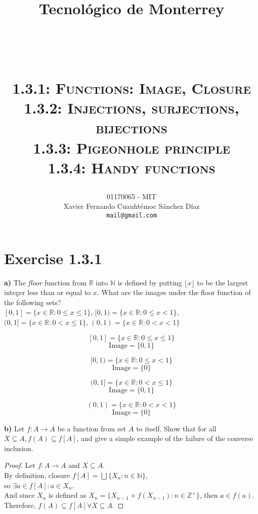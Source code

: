 \documentclass[titlepage, letterpaper, fleqn]{article}
\title{
\vspace{1in}
\textbf{Tecnológico de Monterrey} \\
\vspace{0.5in}
\textmd{\mahclass} \\
\large{\textit{\mahteacher}} \\
\vspace{0.5in}
\textsc{\mahtitle}\\
\textsc{1.3.1: Functions: Image, Closure}\\
\textsc{1.3.2: Injections, surjections, bijections}\\
\textsc{1.3.3: Pigeonhole principle}\\
\textsc{1.3.4: Handy functions}\\
\author{01170065  - MIT \\
Xavier Fernando Cuauhtémoc Sánchez Díaz \\
\texttt{mail@gmail.com}}
\date{\mahdate}
}
\newcommand{\spacepls}{\vspace{5mm}}
\begin{document}
\begin{titlepage}
\maketitle
\end{titlepage}

%
%

\section{Exercise 1.3.1}

{\large \textbf{a)} The \textit{floor} function from \(\mathbb{R}\) into \(\mathbb{N}\) is defined by putting \(\lfloor x \rfloor\) to be the largest integer less than or equal to \(x\).
What are the images under the floor function of the following sets?}\\
\([0,1] = \{x \in \mathbb{R} \colon 0 \leq x \leq 1\}\), \([0,1) = \{x \in \mathbb{R} \colon 0 \leq x < 1\}\),\\
\((0,1] = \{x \in \mathbb{R} \colon 0 < x \leq 1\}\), \((0,1) = \{x \in \mathbb{R} \colon 0 < x < 1\}\)

\[[0,1] = \{x \in \mathbb{R} \colon 0 \leq x \leq 1\}\]
\[\text{Image} = \{0,1\}\]

\[[0,1) = \{x \in \mathbb{R} \colon 0 \leq x < 1\}\]
\[\text{Image} = \{0\}\]

\[(0,1] = \{x \in \mathbb{R} \colon 0 < x \leq 1\}\]
\[\text{Image} = \{0,1\}\]

\[(0,1) = \{x \in \mathbb{R} \colon 0 < x < 1\}\]
\[\text{Image} = \{0\}\]

\spacepls

{\large \textbf{b)} Let \(f\colon A \to A\) be a function from set \(A\) to itself. Show that for all \(X \subseteq A, f(A) \subseteq f[A]\), and give a simple example of the failure of the converse inclusion.}

\begin{proof}
Let \(f\colon A \to A\) and \(X \subseteq A\).\\
By definition, closure \(f[A] = \bigcup \{X_n \colon n \in \mathbb{N}\}\),\\
so \(\exists a \in f[A] \colon a \in X_n\).\\
And since \(X_n\) is defined as \(X_n = \{X_{n-1} + f(X_{n-1}) \colon n \in \mathbb{Z}^+\}\), then \(a \in f(a)\).\\
Therefore, \(f(A) \subseteq f[A] \forall X \subseteq A\).
\end{proof}
\end{document}
